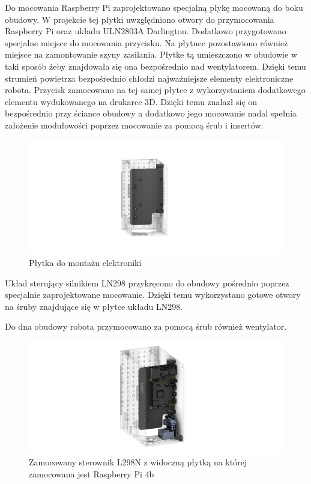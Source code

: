 Do mocowania Raspberry Pi zaprojektowano specjalną płykę mocowaną do boku obudowy. W projekcie tej płytki uwzględniono otwory do przymocowania Raspberry
Pi oraz układu ULN2803A Darlington. Dodatkowo przygotowano specjalne miejsce do mocowania przycisku. Na płytnce pozostawiono również miejsce
na zamontowanie szyny zasilania. Płytke tą umieszczono w obudowie w taki sposób żeby znajdowała się ona bezpośrednio nad wentylatorem. Dzięki temu
strumień powietrza bezpośrednio chłodzi najważniejsze elementy elektroniczne robota. Przycisk zamocowano na tej samej płytce z wykorzystaniem
dodatkowego elementu wydukowanego na drukarce 3D. Dzięki temu znalazł się on bezpośrednio przy ściance obudowy a dodatkowo jego mocowanie
nadal spełnia założenie modułowości poprzez mocowanie za pomocą śrub i insertów.

\begin{figure}[H]
    \centering
    \includegraphics[width=0.95\linewidth]{chapters/03-praca-wlasna/figures/main_board.png}
    \caption{\label{fig:mainboard}Płytka do montażu elektroniki}
\end{figure}

Układ sterujący silnikiem LN298 przykręcono do obudowy pośrednio poprzez specjalnie zaprojektowane mocowanie. Dzięki temu wykorzystano
gotowe otwory na śruby znajdujące się w płytce układu LN298.

Do dna obudowy robota przymocowano za pomocą śrub również wentylator.

\begin{figure}[H]
    \centering
    \includegraphics[width=0.95\linewidth]{chapters/03-praca-wlasna/figures/l298n.png}
    \caption{\label{fig:steownik}Zamocowany sterownik L298N z widoczną płytką na której zamocowana jest Raspberry Pi 4b}
\end{figure}

